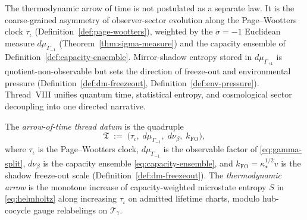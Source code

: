 The thermodynamic arrow of time is not postulated as a separate law. It is the
coarse-grained asymmetry of observer-sector evolution along the Page--Wootters
clock $\tau_\iota$ (Definition~\ref{def:page-wootters}), weighted by the
$\sigma=-1$ Euclidean measure $d\mu_{\Gamma_{-1}}$
(Theorem~\ref{thm:sigma-measure}) and the capacity ensemble of
Definition~\ref{def:capacity-ensemble}. Mirror-shadow entropy stored in
$d\mu_{\Gamma_{+1}}$ is quotient-non-observable but sets the direction of
freeze-out and environmental pressure
(Definition~\ref{def:dm-freezeout}, Definition~\ref{def:env-pressure}).
Thread~VIII unifies quantum time, statistical entropy, and cosmological
sector decoupling into one directed narrative.

\begin{definition}\label{def:thread-8}
The \emph{arrow-of-time thread datum} is the quadruple
\begin{equation}\label{eq:thread-8-datum}
  \mathfrak{T}
  \;:=\;
  \bigl(
    \tau_\iota,\;
    d\mu_{\Gamma_{-1}},\;
    d\nu_\beta,\;
    k_{\mathrm{FO}}
  \bigr),
\end{equation}
where $\tau_\iota$ is the Page--Wootters clock,
$d\mu_{\Gamma_{-1}}$ is the observable factor of \eqref{eq:gamma-split},
$d\nu_\beta$ is the capacity ensemble \eqref{eq:capacity-ensemble}, and
$k_{\mathrm{FO}}=\kappa_\star^{1/2}v$ is the shadow freeze-out scale
(Definition~\ref{def:dm-freezeout}). The \emph{thermodynamic arrow} is the
monotone increase of capacity-weighted microstate entropy $S$ in
\eqref{eq:helmholtz} along increasing $\tau_\iota$ on admitted lifetime charts,
modulo hub-cocycle gauge relabelings on $\mathcal{T}_7$.
\end{definition}

